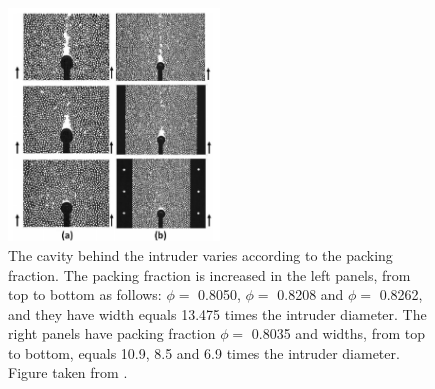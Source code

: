 \begin{figure}
    \centering
    \includegraphics[width=0.5\textwidth]{04-figuras/box_Kolb.png}
    \caption{The cavity behind the intruder varies according to the packing fraction. The packing fraction is increased in the left panels, from top to bottom as follows: $\phi=$ 0.8050, $\phi=$ 0.8208 and $\phi=$ 0.8262, and they have width equals 13.475 times the intruder diameter. The right panels have packing fraction $\phi=$ 0.8035 and widths, from top to bottom, equals 10.9, 8.5 and 6.9 times the intruder diameter. Figure taken from \cite{Jamming_and_unjamming_by_penetration_of_a_cylindrical_intruder}.}
    \label{fig:box_Kolb}
\end{figure}



